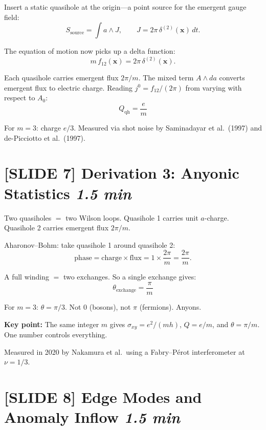 \documentclass[11pt]{article}
\begin{document}
Insert a static quasihole at the origin---a point source for the emergent gauge field:
\begin{equation}
S_{\mathrm{source}} = \int a \wedge J, \qquad J = 2\pi\,\delta^{(2)}(\mathbf{x})\,dt.
\end{equation}

The equation of motion now picks up a delta function:
\begin{equation}
m\,f_{12}(\mathbf{x}) = 2\pi\,\delta^{(2)}(\mathbf{x}).
\end{equation}

Each quasihole carries emergent flux $2\pi/m$. The mixed term $A \wedge da$ converts emergent flux to electric charge. Reading $j^0 = f_{12}/(2\pi)$ from varying with respect to $A_0$:
\begin{equation}
\boxed{Q_{\mathrm{qh}} = \frac{e}{m}}
\end{equation}

For $m=3$: charge $e/3$. Measured via shot noise by Saminadayar et al.\ (1997) and de-Picciotto et al.\ (1997).

\section{[SLIDE 7] Derivation 3: Anyonic Statistics \hfill \normalfont\textit{1.5 min}}

Two quasiholes $=$ two Wilson loops. Quasihole 1 carries unit $a$-charge. Quasihole 2 carries emergent flux $2\pi/m$.

Aharonov--Bohm: take quasihole 1 around quasihole 2:
\begin{equation}
\text{phase} = \text{charge} \times \text{flux} = 1 \times \frac{2\pi}{m} = \frac{2\pi}{m}.
\end{equation}

A full winding $=$ two exchanges. So a single exchange gives:
\begin{equation}
\boxed{\theta_{\mathrm{exchange}} = \frac{\pi}{m}}
\end{equation}

For $m=3$: $\theta = \pi/3$. Not 0 (bosons), not $\pi$ (fermions). Anyons.

\textbf{Key point:} The same integer $m$ gives $\sigma_{xy} = e^2/(mh)$, $Q = e/m$, and $\theta = \pi/m$. One number controls everything.

Measured in 2020 by Nakamura et al.\ using a Fabry--P\'erot interferometer at $\nu = 1/3$.

\section{[SLIDE 8] Edge Modes and Anomaly Inflow \hfill \normalfont\textit{1.5 min}}
\end{document}
